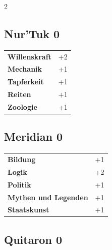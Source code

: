\begin{multicols}{2}
\begin{tcolorbox}
\end{tcolorbox}

\begin{tcolorbox}
    \subsection*{Nur'Tuk \hfill \small{0 }}
    \tcblower




\begin{tabular}{@{}ll@{}}
    \textbf{Willenskraft} & +2\\
    \textbf{Mechanik} & +1\\
    \textbf{Tapferkeit} & +1\\
    \textbf{Reiten} & +1\\
    \textbf{Zoologie} & +1\\
\end{tabular}


\end{tcolorbox}

\begin{tcolorbox}
    \subsection*{Meridian \hfill \small{0 }}
    \tcblower




\begin{tabular}{@{}ll@{}}
    \textbf{Bildung} & +1\\
    \textbf{Logik} & +2\\
    \textbf{Politik} & +1\\
    \textbf{Mythen und Legenden} & +1\\
    \textbf{Staatskunst} & +1\\
\end{tabular}


\end{tcolorbox}

\begin{tcolorbox}
    \subsection*{Quitaron \hfill \small{0 }}
    \tcblower





\end{tcolorbox}
\end{multicols}
